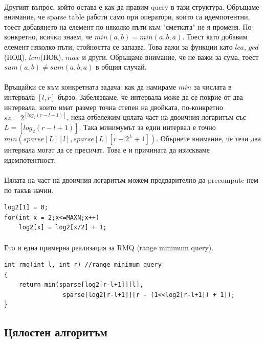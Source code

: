 \documentclass[12pt]{article}
\begin{document}
\paragraph*{}
Другият въпрос, който остава е как да правим query в тази структура. Обръщаме внимание, че sparse table работи само при оператори, които са идемпотентни, тоест добавянето на елемент по няколко пъти към "сметката" не я променя. По-конкретно, всички знаем, че $min(a, b) = min(a, b, a)$. Тоест като добавим елемент няколко пъти, стойността се запазва. Това важи за функции като $lca$, $gcd$(НОД), $lcm$(НОК), $max$ и други. Обръщаме внимание, че не важи за сума, тоест $sum(a, b) \neq sum(a, b, a)$ в общия случай.
\paragraph*{}
Връщайки се към конкретната задача: как да намираме $min$ за числата в интервала $[l, r]$ бързо. Забелязваме, че интервала може да се покрие от два интервала, които имат размер точна степен на двойката, по-конкретно $sz = 2^{[log_2(r-l+1)]}$, нека отбележим цялата част на двоичния логаритъм със $L = [log_2(r-l+1)]$. Така минимумът за един интервал е точно $min(sparse[L][l], sparse[L][r-2^L+1])$. Обърнете внимание, че тези два интервала могат да се пресичат. Това е и причината да изискваме идемпотентност.   
\paragraph*{}
Цялата на част на двоичния логаритъм можем предварително да precompute-нем по такъв начин.

\begin{lstlisting}
log2[1] = 0;
for(int x = 2;x<=MAXN;x++)
    log2[x] = log2[x/2] + 1;
\end{lstlisting}

\paragraph*{}
Ето и една примерна реализация за RMQ (range minimum query).
\begin{lstlisting}
int rmq(int l, int r) //range minimum query
{
    return min(sparse[log2[r-l+1]][l], 
                sparse[log2[r-l+1]][r - (1<<log2[r-l+1]) + 1]);
}
\end{lstlisting}

\subsection*{Цялостен алгоритъм}
\end{document}
